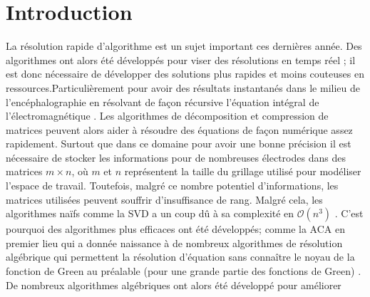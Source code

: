 \documentclass[fleqn,10pt]{SelfArx} %
\affiliation{\textsuperscript{1}\textit{Étudiant en cycle d'ingénieur généraliste, IMT Atlantique}} %
\affiliation{*\textbf{mail}: zaccarie.kanit@imt-atlantique.net} %
\begin{document}
\maketitle %

\tableofcontents %

\thispagestyle{empty} %


\section*{Introduction} %


La résolution rapide d'algorithme est un sujet important ces dernières année. Des algorithmes ont alors été développés pour viser des résolutions en temps réel ; il est donc nécessaire de développer des solutions plus rapides et moins couteuses en ressources.Particulièrement pour avoir des résultats instantanés dans le milieu de l'encéphalographie en résolvant de façon récursive  l'équation intégral de l'électromagnétique \cite{tamayo_multilevel_2011}. Les algorithmes de décomposition et compression de matrices peuvent alors aider à résoudre des équations de façon numérique assez rapidement. Surtout que dans ce domaine pour avoir une bonne précision il est nécessaire de stocker les informations pour de nombreuses électrodes dans des matrices $m \times n$, où $m$ et $n$ représentent la taille du grillage utilisé pour modéliser l'espace de travail. Toutefois, malgré ce nombre potentiel d'informations, les matrices utilisées peuvent souffrir d'insuffisance de rang. Malgré cela, les algorithmes naïfs comme la SVD a un coup dû à sa complexité en $\mathcal{O}(n^3)$ \cite{bebendorf_hierarchical_2008}. C'est pourquoi des algorithmes plus efficaces ont été développés; comme la ACA \cite{zhao_adaptive_2005} en premier lieu qui a donnée naissance à de nombreux algorithmes de résolution algébrique qui permettent la résolution d'équation sans connaître le noyau de la fonction de Green au préalable (pour une grande partie des fonctions de Green) \cite{bebendorf_hierarchical_2008}. De nombreux algorithmes algébriques ont alors été développé pour améliorer 
\end{document}
